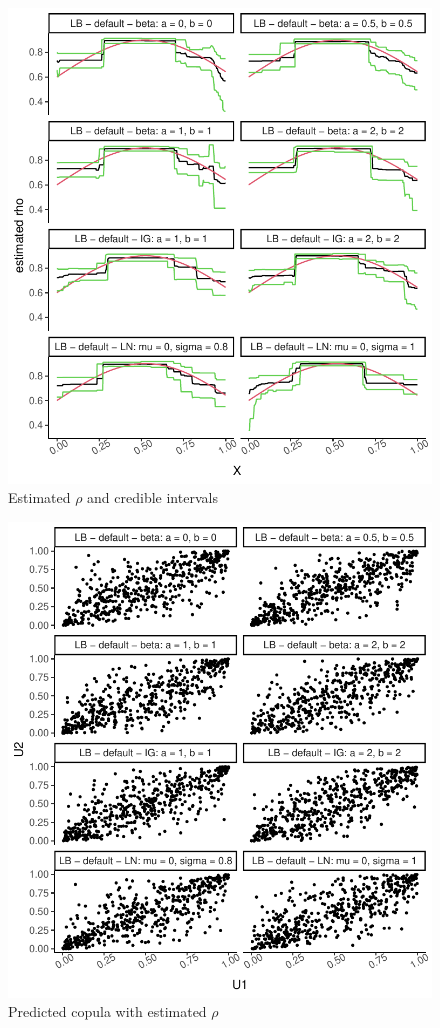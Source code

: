 \documentclass{amsart}
\begin{document}
\fi
\begin{figure}[ht]
	\centering
	\includegraphics[width=0.95\linewidth]{predicted_rho_3.pdf}
	\caption{Estimated $\rho$ and credible intervals}
	\label{fig:pred:rho:3}
\end{figure}

\begin{figure}[ht]
	\centering
	\includegraphics[width=0.95\linewidth]{simulated_copula_3.pdf}
	\caption{Predicted copula with estimated $\rho$}
	\label{fig:sim:copula:3}
\end{figure}
\end{document}
